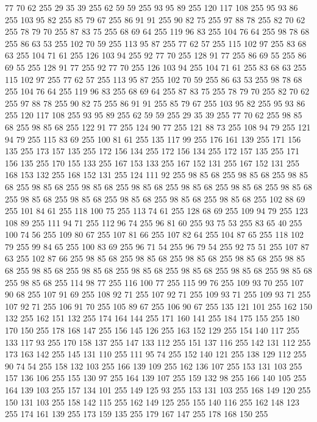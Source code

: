 77 70 62 255 29 35 39 255 62 59 59 255 93 95 89 255 120 117 108 255 95 93 86 255 103 95 82 255 85 79 67 255 86 91 91 255 90 82 75 255 97 88 78 255 82 70 62 255 78 79 70 255 87 83 75 255 68 69 64 255 119 96 83 255 104 76 64 255 98 78 68 255 86 63 53 255 102 70 59 255 113 95 87 255 77 62 57 255 115 102 97 255 83 68 63 255 104 71 61 255 126 103 94 255 92 77 70 255 128 91 77 255 86 69 55 255 86 69 55 255 128 91 77 255 92 77 70 255 126 103 94 255 104 71 61 255 83 68 63 255 115 102 97 255 77 62 57 255 113 95 87 255 102 70 59 255 86 63 53 255 98 78 68 255 104 76 64 255 119 96 83 255 68 69 64 255 87 83 75 255 78 79 70 255 82 70 62 255 97 88 78 255 90 82 75 255 86 91 91 255 85 79 67 255 103 95 82 255 95 93 86 255 120 117 108 255 93 95 89 255 62 59 59 255 29 35 39 255 77 70 62 255 98 85 68 255 98 85 68 255 122 91 77 255 124 90 77 255 121 88 73 255 108 94 79 255
121 94 79 255 115 83 69 255 100 81 61 255 135 117 99 255 176 161 139 255 171 156 135 255 173 157 135 255 172 156 134 255 172 156 134 255 172 157 135 255 171 156 135 255 170 155 133 255 167 153 133 255 167 152 131 255 167 152 131 255 168 153 132 255 168 152 131 255 124 111 92 255 98 85 68 255 98 85 68 255 98 85 68 255 98 85 68 255 98 85 68 255 98 85 68 255 98 85 68 255 98 85 68 255 98 85 68 255 98 85 68 255 98 85 68 255 98 85 68 255 98 85 68 255 98 85 68 255 102 88 69 255 101 84 61 255 118 100 75 255 113 74 61 255 128 68 69 255 109 94 79 255 123 108 89 255 111 94 71 255 112 96 74 255 96 81 60 255 93 75 53 255 83 65 40 255 100 74 56 255 109 80 67 255 107 81 66 255 107 82 64 255 104 87 65 255 118 102 79 255 99 84 65 255 100 83 69 255 96 71 54 255 96 79 54 255 92 75 51 255 107 87 63 255 102 87 66 255 98 85 68 255 98 85 68 255 98 85 68 255 98 85 68 255 98 85 68 255 98 85 68 255 98 85 68 255
98 85 68 255 98 85 68 255 98 85 68 255 98 85 68 255 98 85 68 255 114 98 77 255 116 100 77 255 115 99 76 255 109 93 70 255 107 90 68 255 107 91 69 255 108 92 71 255 107 92 71 255 109 93 71 255 109 93 71 255 107 92 71 255 106 91 70 255 105 89 67 255 106 90 67 255 135 121 101 255 162 150 132 255 162 151 132 255 174 164 144 255 171 160 141 255 184 175 155 255 180 170 150 255 178 168 147 255 156 145 126 255 163 152 129 255 154 140 117 255 133 117 93 255 170 158 137 255 147 133 112 255 151 137 116 255 142 131 112 255 173 163 142 255 145 131 110 255 111 95 74 255 152 140 121 255 138 129 112 255 90 74 54 255 158 132 103 255 166 139 109 255 162 136 107 255 153 131 103 255 157 136 106 255 155 130 97 255 164 139 107 255 159 132 98 255 166 140 105 255 164 139 103 255 157 134 101 255 149 125 93 255 153 131 103 255 168 149 120 255 150 131 103 255 158 142 115 255 162 149 125 255 155 140 116 255 162 148 123 255 174 161 139 255 173 159 135 255 179 167 147 255 178 168 150 255
